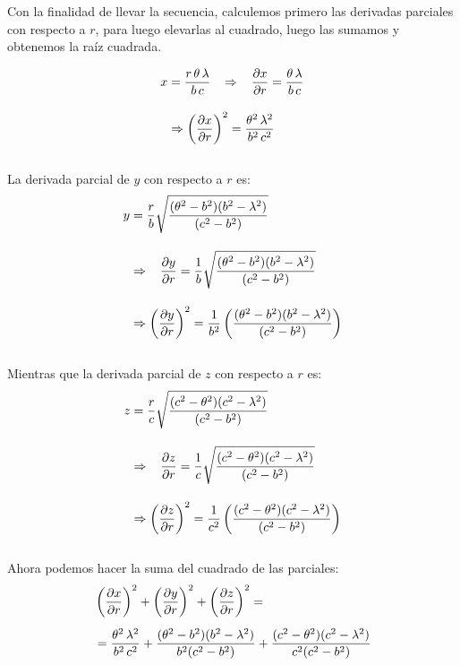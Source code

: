Con la finalidad de llevar la secuencia, calculemos primero las derivadas parciales con respecto a $r$, para luego elevarlas al cuadrado, luego las sumamos y obtenemos la raíz cuadrada.

\begin{align*}
x &= \dfrac{r \, \theta \, \lambda}{b \, c} \hspace{0.3cm} \Rightarrow \hspace{0.3cm}  \displaystyle \pdv{x}{r} = \dfrac{\theta \, \lambda}{b \, c} \\[1em] 
&\Rightarrow \displaystyle \left( \pdv{x}{r} \right)^{2} = \dfrac{\theta^{2} \, \lambda^{2}}{b^{2} \, c^{2}}
\end{align*}
\\
La derivada parcial de $y$ con respecto a $r$ es:
\begin{align*}
y &= \dfrac{r}{b} \sqrt{\dfrac{(\theta^{2} - b^{2})(b^{2} - \lambda^{2})}{(c^{2} - b^{2})}} \\[1em] 
&\Rightarrow \hspace{0.3cm} \displaystyle \pdv{y}{r} = \dfrac{1}{b} \sqrt{\dfrac{(\theta^{2} - b^{2})(b^{2} - \lambda^{2})}{(c^{2} - b^{2})}} \\[1em] 
&\Rightarrow \left( \pdv{y}{r} \right)^{2} = \dfrac{1}{b^{2}} \left( \dfrac{(\theta^{2} - b^{2})(b^{2} - \lambda^{2})}{(c^{2} - b^{2})}\right)
\end{align*}
\\
Mientras que la derivada parcial de $z$ con respecto a $r$ es:
\begin{align*}
z &= \dfrac{r}{c} \sqrt{\dfrac{(c^{2} - \theta^{2})(c^{2} - \lambda^{2})}{(c^{2} - b^{2})}} \\[1em] 
&\Rightarrow \hspace{0.3cm} \displaystyle \pdv{z}{r} = \dfrac{1}{c} \sqrt{\dfrac{(c^{2} - \theta^{2})(c^{2} - \lambda^{2})}{(c^{2} - b^{2})}} \\[1em] 
&\Rightarrow \left( \pdv{z}{r} \right)^{2} = \dfrac{1}{c^{2}} \left( \dfrac{(c^{2} - \theta^{2})(c^{2} - \lambda^{2})}{(c^{2} - b^{2})} \right)
\end{align*}
\\
Ahora podemos hacer la suma del cuadrado de las parciales:
\begin{align*}
&{} \left( \pdv{x}{r} \right)^{2} + \left( \pdv{y}{r} \right)^{2} + \left( \pdv{z}{r} \right)^{2} = \\[0.5em] 
&= \dfrac{\theta^{2} \, \lambda^{2}}{b^{2} \, c^{2}} + \dfrac{(\theta^{2} - b^{2})(b^{2} - \lambda^{2})}{b^{2} (c^{2} - b^{2})} + \dfrac{(c^{2} - \theta^{2})(c^{2} - \lambda^{2})}{c^{2} (c^{2} - b^{2})}
\end{align*}
